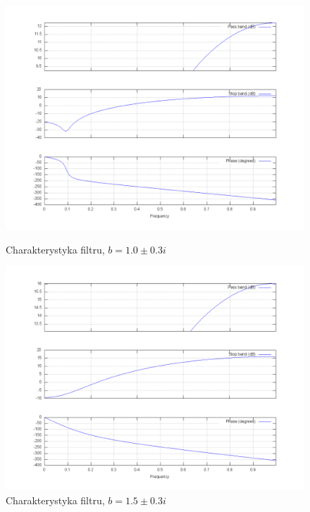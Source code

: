 \documentclass[wide,a4paper,titlepage,12pt]{mwart}
\begin{document}
  \begin{figure}[htbp]
    \begin{center}
      \includegraphics[scale=.3]{out/fig21.png}
      \caption{\label{fig21} Charakterystyka filtru, $b=1.0\pm0.3i$}
      \includegraphics[scale=.3]{out/fig22.png}
      \caption{\label{fig22} Charakterystyka filtru, $b=1.5\pm0.3i$}

    \end{center}
  \end{figure}
\end{document}
